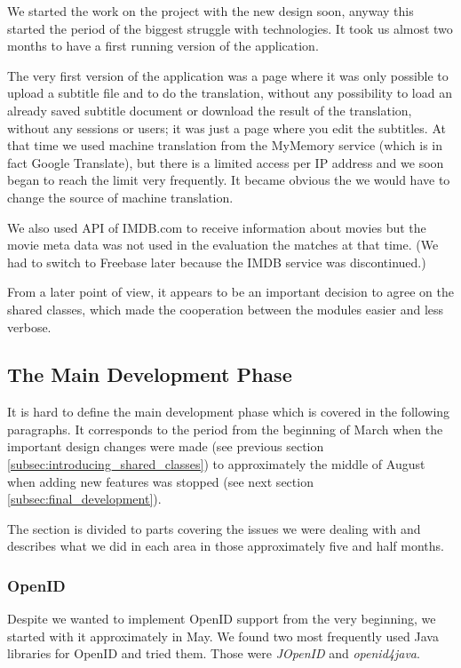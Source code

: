 We started the work on the project with the new design soon, anyway this started the period of the biggest struggle with technologies. It took us almost two months to have a first running version of the application.

The very first version of the application was a page where it was only possible to upload a subtitle file and to do the translation, without any possibility to load an already saved subtitle document or download the result of the translation, without any sessions or users; it was just a page where you edit the subtitles.
At that time we used machine translation from the MyMemory service (which is in fact Google Translate), but there is a limited access per IP address and we soon began to reach the limit very frequently. It became obvious the we would have to change the source of machine translation. 

We also used API of IMDB.com to receive information about movies but the movie meta data was not used in the evaluation the matches at that time. (We had to switch to Freebase later because the IMDB service was discontinued.)

From a later point of view, it appears to be an important decision to agree on the shared classes, which made the cooperation between the modules easier and less verbose. 

\subsection{The Main Development Phase}

It is hard to define the main development phase which is covered in the following paragraphs. It corresponds to the period from the beginning of March when the important design changes were made (see previous section \ref{subsec:introducing_shared_classes}) to approximately the middle of August when adding new features was stopped (see next section \ref{subsec:final_development}).

The section is divided to parts covering the issues we were dealing with and describes what we did in each area in those approximately five and half months.

\subsubsection{OpenID}
\label{subsubsec:openid}

Despite we wanted to implement OpenID support from the very beginning, we started with it approximately in May. We found two most frequently used Java libraries for OpenID and tried them. Those were \emph{JOpenID} and \emph{openid4java}.

